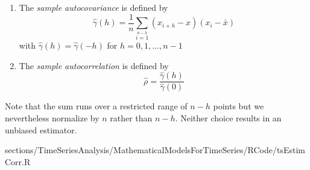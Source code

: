 {{\begin{enumerate}
	\item The \textit{sample autocovariance} is defined by
	$$\hat{\gamma}(h)= \frac{1}{n} \sum\limits_{i=1}\limits^{n-h}(x_{i+h}-\hat{x})(x_i-\bar{x})$$ 
	with $\hat{\gamma}(h)=\hat{\gamma}(-h)$ for $h=0,1,...,n-1$
	\item The \textit{sample autocorrelation} is defined by
	$$\hat{\rho}=\frac{\hat{\gamma}(h)}{\hat{\gamma}(0)} $$
\end{enumerate}
Note that the sum runs over a restricted range of $n-h$ points but we nevertheless normalize by $n$ rather than $n-h$. Neither choice results in an unbiased estimator.
}
{sections/TimeSeriesAnalysis/MathematicalModelsForTimeSeries/RCode/tsEstimCorr.R}


}
